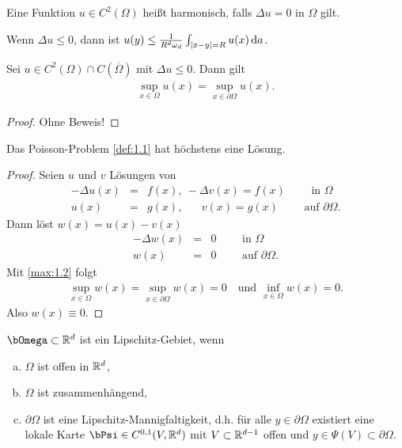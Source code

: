 \begin{Bezeichnung}
    Eine Funktion $u \in C^2(\Omega)$ heißt harmonisch, falls $\Delta u = 0$ in $\Omega$ gilt.
\end{Bezeichnung}


\begin{Bemerkung}
    Wenn $\Delta u \le 0$, dann ist $u(y) \le \frac{1}{R^d \omega_d}
    \int_{|x-y|=R} u(x) \,\mathrm{d}a$.
\end{Bemerkung}


\begin{Maximumsprinzip}
\label{max:1.2}
    Sei $u\in C^2(\Omega)\cap C(\overline\Omega)$ mit $\Delta u \le 0$.
    Dann gilt
    \begin{eqnarray*}
        \sup_{x\in \Omega} u(x) = \sup_{x\in \partial\Omega} u(x).
    \end{eqnarray*}
\end{Maximumsprinzip}


\begin{proof}
    Ohne Beweis!
\end{proof}


\begin{Folgerung}
    \label{fol:1.3}
    Das Poisson-Problem \eqref{def:1.1} hat höchstens eine Lösung.
\end{Folgerung}


\begin{proof}
    Seien $u$ und $v$ Lösungen von
    \begin{eqnarray*}
        -\Delta u(x) &=& f(x), \
        -\Delta  v(x) = f(x)
        \qquad \text{ in } \Omega \\
        u(x) &=& g(x),
        \ \ \quad \ v(x) = g(x)
        \qquad \text{ auf } \partial\Omega. 
    \end{eqnarray*}
    Dann  löst $w(x) = u(x) - v(x)$
    \begin{eqnarray*}
        -\Delta w(x) &=& 0 \qquad \text{ in } \Omega \\
        w(x) &=& 0 \qquad \text{ auf } \partial\Omega.
    \end{eqnarray*}
    Mit \eqref{max:1.2} folgt
    \begin{eqnarray*}
        \sup_{x\in \Omega} w(x) = \sup_{x\in \partial\Omega} w(x) = 0
        \quad \text{und } \inf_{x\in \Omega} w(x) = 0.
    \end{eqnarray*}
    Also $w(x) \equiv 0$.
\end{proof}


\begin{Definition}
    \label{def:1.4}
    $\Omega\subset \R^d$ ist ein Lipschitz-Gebiet, wenn
    \begin{enumerate}[a)]
	\item
	    $\Omega$ ist offen in $\mathbb{R}^d$,
	\item
	    $\Omega$ ist zusammenhängend,
	\item
	    $\partial\Omega$ ist eine Lipschitz-Mannigfaltigkeit, d.h. für alle
	    $y\in \partial\Omega$ existiert eine lokale Karte $\Psi\in C^{0,1}
        (V, \R^d)$ mit $V\subset \mathbb{R}^{d-1}$ offen und $y\in \Psi(V)
        \subset \partial\Omega$.
    \end{enumerate}
\end{Definition}


